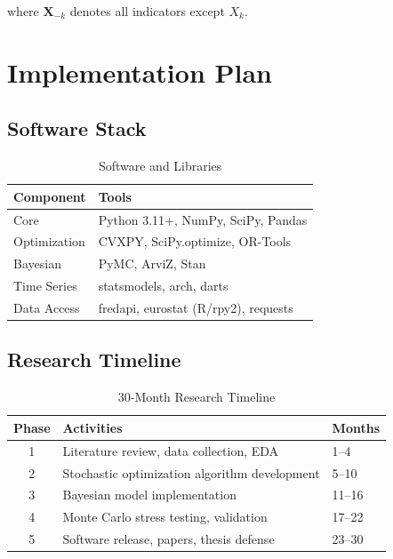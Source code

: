 \documentclass[12pt,a4paper]{article}
\begin{document}
where $\mathbf{X}_{-k}$ denotes all indicators except $X_k$.

\section{Implementation Plan}

\subsection{Software Stack}

\begin{table}[htbp]
\centering
\caption{Software and Libraries}
\label{tab:software}
\begin{tabular}{@{}ll@{}}
\toprule
\textbf{Component} & \textbf{Tools} \\
\midrule
Core & Python 3.11+, NumPy, SciPy, Pandas \\
Optimization & CVXPY, SciPy.optimize, OR-Tools \\
Bayesian & PyMC, ArviZ, Stan \\
Time Series & statsmodels, arch, darts \\
Data Access & fredapi, eurostat (R/rpy2), requests \\
\bottomrule
\end{tabular}
\end{table}

\subsection{Research Timeline}

\begin{table}[htbp]
\centering
\caption{30-Month Research Timeline}
\label{tab:timeline}
\begin{tabular}{@{}cll@{}}
\toprule
\textbf{Phase} & \textbf{Activities} & \textbf{Months} \\
\midrule
1 & Literature review, data collection, EDA & 1--4 \\
2 & Stochastic optimization algorithm development & 5--10 \\
3 & Bayesian model implementation & 11--16 \\
4 & Monte Carlo stress testing, validation & 17--22 \\
5 & Software release, papers, thesis defense & 23--30 \\
\bottomrule
\end{tabular}
\end{table}
\end{document}
